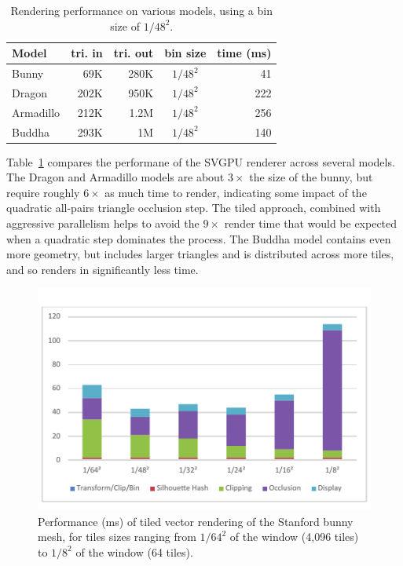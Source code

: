 \documentclass[review]{acmsiggraph}
\begin{document}
\begin{table} \centering
\begin{tabular}{|l|r|r|c|r|} \hline
\bf Model & \bf tri. in & \bf tri. out & \bf bin size & \bf time (ms) \\
\hline
Bunny & 69K & 280K & $1/48^2$ & 41 \\ 
Dragon & 202K & 950K & $1/48^2$ & 222 \\
Armadillo & 212K & 1.2M & $1/48^2$ & 256 \\
Buddha & 293K & 1M & $1/48^2$ & 140 \\ \hline
\end{tabular}
\caption{Rendering performance on various models, using a bin size of
$1/48^2.$}
\label{tab:modelperf}
\end{table}

Table~\ref{tab:modelperf} compares the performane of the SVGPU renderer
across several models. The Dragon and Armadillo models are about $3\times$ the
size of the bunny, but require roughly $6\times$ as much time to render,
indicating some impact of the quadratic all-pairs triangle occlusion step. The
tiled approach, combined with aggressive parallelism helps to avoid the
$9\times$ render time that would be expected when a quadratic step dominates
the process. The Buddha model contains even more geometry, but includes larger
triangles and is distributed across more tiles, and so renders in
significantly less time.

\begin{figure} \centering
\includegraphics{images/binperf.pdf}
\caption{Performance (ms) of tiled vector rendering of the Stanford bunny mesh,
for tiles sizes ranging from $1/64^2$ of the window (4,096 tiles) to $1/8^2$ of
the window (64 tiles).}
\label{fig:binperf}
\end{figure}
\end{document}
